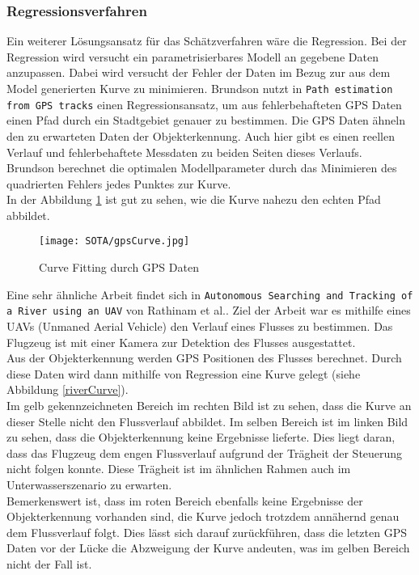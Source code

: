 \subsubsection{Regressionsverfahren}
Ein weiterer Lösungsansatz für das Schätzverfahren wäre die Regression. Bei der Regression wird versucht ein parametrisierbares Modell an gegebene Daten anzupassen. Dabei wird versucht der Fehler der Daten im Bezug zur aus dem Model generierten Kurve zu minimieren.
Brundson nutzt in \texttt{Path estimation from GPS tracks}\cite{brunsdon2007path} einen Regressionsansatz, um aus fehlerbehafteten GPS Daten einen Pfad durch ein Stadtgebiet genauer zu bestimmen. Die GPS Daten ähneln den zu erwarteten Daten der Objekterkennung. Auch hier gibt es einen reellen Verlauf und fehlerbehaftete Messdaten zu beiden Seiten dieses Verlaufs.\\
Brundson berechnet die optimalen Modellparameter durch das Minimieren des quadrierten Fehlers jedes Punktes zur Kurve.\\
In der Abbildung \ref{gpsfit} ist gut zu sehen, wie die Kurve nahezu den echten Pfad abbildet.
\begin{figure}[H]
\centering
\texttt{[image: SOTA/gpsCurve.jpg]}
\caption{Curve Fitting durch GPS Daten}
\label{gpsfit}
\end{figure}
Eine sehr ähnliche Arbeit findet sich in \texttt{Autonomous Searching and Tracking of a River using an UAV}\cite{rathinam2007autonomous} von Rathinam et al.. Ziel der Arbeit war es mithilfe eines UAVs (Unmaned Aerial Vehicle) den Verlauf eines Flusses zu bestimmen. Das Flugzeug ist mit einer Kamera zur Detektion des Flusses ausgestattet.\\
Aus der Objekterkennung werden GPS Positionen des Flusses berechnet. Durch diese Daten wird dann mithilfe von Regression eine Kurve gelegt (siehe Abbildung \ref{riverCurve}).\\
Im gelb gekennzeichneten Bereich im rechten Bild ist zu sehen, dass die Kurve an dieser Stelle nicht den Flussverlauf abbildet. Im selben Bereich ist im linken Bild zu sehen, dass die Objekterkennung keine Ergebnisse lieferte. Dies liegt daran, dass das Flugzeug dem engen Flussverlauf aufgrund der Trägheit der Steuerung nicht folgen konnte. Diese Trägheit ist im ähnlichen Rahmen auch im Unterwasserszenario zu erwarten.\\
Bemerkenswert ist, dass im roten Bereich ebenfalls keine Ergebnisse der Objekterkennung vorhanden sind, die Kurve jedoch trotzdem annähernd genau dem Flussverlauf folgt. Dies lässt sich darauf zurückführen, dass die letzten GPS Daten vor der Lücke die Abzweigung der Kurve andeuten, was im gelben Bereich nicht der Fall ist.
